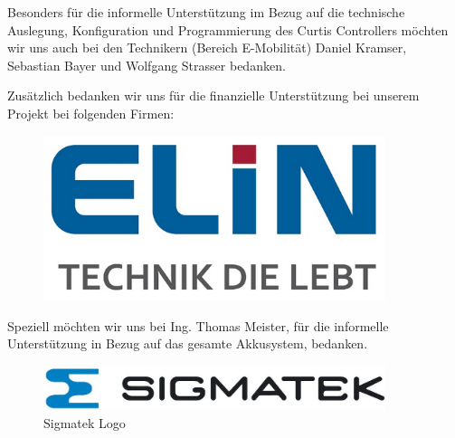 Besonders für die informelle Unterstützung im Bezug auf die technische Auslegung, Konfiguration und Programmierung des Curtis Controllers möchten wir uns auch bei den Technikern (Bereich E-Mobilität) Daniel Kramser, Sebastian Bayer und Wolfgang Strasser bedanken.

\newpage

Zusätzlich bedanken wir uns für die finanzielle Unterstützung bei unserem Projekt bei folgenden Firmen:

\begin{figure}[H]
	\begin{center}
		\includegraphics[width=10cm]{figures/allgemein/Elin Logo.png}
	\end{center}
\end{figure}

Speziell möchten wir uns bei Ing. Thomas Meister, für die informelle Unterstützung in Bezug auf das gesamte Akkusystem, bedanken.
\vspace{1cm}

\begin{figure} [H]
	\begin{center}
		\includegraphics[width=10cm]{figures/allgemein/Sigmatek_LOGO.jpg}
		\caption{Sigmatek Logo}
	\end{center}
\end{figure}


\newpage
\thispagestyle{empty}
\mbox{}
\newpage



